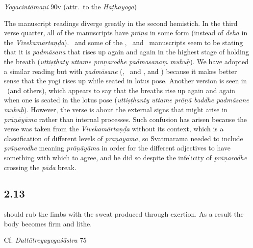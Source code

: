 \begin{ekdosis}
\begin{testimonia}[hp02_012]
\emph{Yogacintāmaṇi} 90v (attr.~to the \emph{Haṭhayoga})

\begin{versinnote}
\end{versinnote}
\end{testimonia}

\begin{philcomm}[hp02_012]
The manuscript readings diverge greatly in the second hemistich. In the third verse quarter, all of the manuscripts have \emph{prāṇa} in some form (instead of \emph{deha} in the \emph{Vivekamārtaṇḍa}). \textalpha\ and some of the \textbeta, \textepsilon\ and \texteta\ manuscripts seem to be stating that it is \emph{padmāsana} that rises up again and again in the highest stage of holding the breath (\emph{uttiṣṭhaty uttame prāṇarodhe padmāsanaṃ muhuḥ}). We have adopted a similar reading but with \emph{padmāsane} (\betaTwo, \deltaOne\ and \deltaThree, and \etaTwo) because it makes better sense that the yogi rises up while seated in lotus pose. Another version is seen in \etaTwo\ (and others), which appears to say that the breaths rise up again and again when one is seated in the lotus pose (\emph{uttiṣṭhanty uttame prāṇā baddhe padmāsane muhuḥ}). However, the verse is about the external signs that might arise in \emph{prāṇāyāma} rather than internal processes. Such confusion has arisen because the verse was taken from the \emph{Vivekamārtaṇḍa} without its context, which is a classification of different levels of \emph{prāṇāyāma}, so Svātmārāma needed to include \emph{prāṇarodhe} meaning \emph{prāṇāyāma} in order for the different adjectives to have something with which to agree, and he did so despite the infelicity of \emph{prāṇarodhe} crossing the \emph{pāda} break.
\end{philcomm}

\subsection*{2.13}
\begin{translation} should rub the limbs with the sweat produced through exertion. As a result the body becomes firm and lithe.%
\end{translation}

\begin{sources}[hp02_013]
Cf. \emph{Dattātreyayogaśāstra} 75


\end{sources}
\end{ekdosis}

